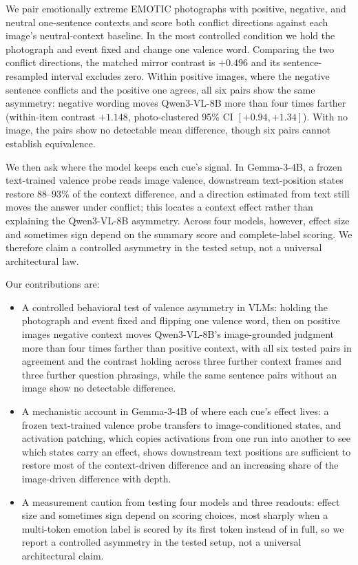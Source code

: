 \documentclass{article}
\newcommand{\gemma}{Gemma-3-4B}
\newcommand{\qwen}{Qwen3-VL-8B}
\begin{document}
We pair emotionally extreme EMOTIC photographs \citep{kosti2019} with positive, negative, and neutral one-sentence contexts and score both conflict directions against each image's neutral-context baseline. In the most controlled condition we hold the photograph and event fixed and change one valence word. Comparing the two conflict directions, the matched mirror contrast is $+0.496$ and its sentence-resampled interval excludes zero. Within positive images, where the negative sentence conflicts and the positive one agrees, all six pairs show the same asymmetry: negative wording moves \qwen{} more than four times farther (within-item contrast $+1.148$, photo-clustered 95\% CI $[+0.94,+1.34]$). With no image, the pairs show no detectable mean difference, though six pairs cannot establish equivalence.

We then ask where the model keeps each cue's signal. In \gemma{}, a frozen text-trained valence probe \citep{tak2025} reads image valence, downstream text-position states restore $88$--$93\%$ of the context difference, and a direction estimated from text still moves the answer under conflict; this locates a context effect rather than explaining the \qwen{} asymmetry. Across four models, however, effect size and sometimes sign depend on the summary score and complete-label scoring. We therefore claim a controlled asymmetry in the tested setup, not a universal architectural law.

Our contributions are:
\begin{itemize}\setlength\itemsep{0pt}
  \item A controlled behavioral test of valence asymmetry in VLMs: holding the photograph and event fixed and flipping one valence word, then on positive images negative context moves \qwen{}'s image-grounded judgment more than four times farther than positive context, with all six tested pairs in agreement and the contrast holding across three further context frames and three further question phrasings, while the same sentence pairs without an image show no detectable difference.
  \item A mechanistic account in \gemma{} of where each cue's effect lives: a frozen text-trained valence probe transfers to image-conditioned states, and activation patching, which copies activations from one run into another to see which states carry an effect, shows downstream text positions are sufficient to restore most of the context-driven difference and an increasing share of the image-driven difference with depth.
  \item A measurement caution from testing four models and three readouts: effect size and sometimes sign depend on scoring choices, most sharply when a multi-token emotion label is scored by its first token instead of in full, so we report a controlled asymmetry in the tested setup, not a universal architectural claim.
\end{itemize}
\fi
\end{document}
